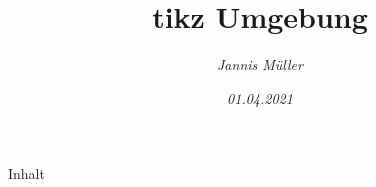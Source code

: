 \documentclass[a4paper, 15pt]{article}
\title{tikz Umgebung}
\date{\slshape 01.04.2021}
\author{\slshape Jannis Müller}
\begin{document}
Inhalt
\end{document}
